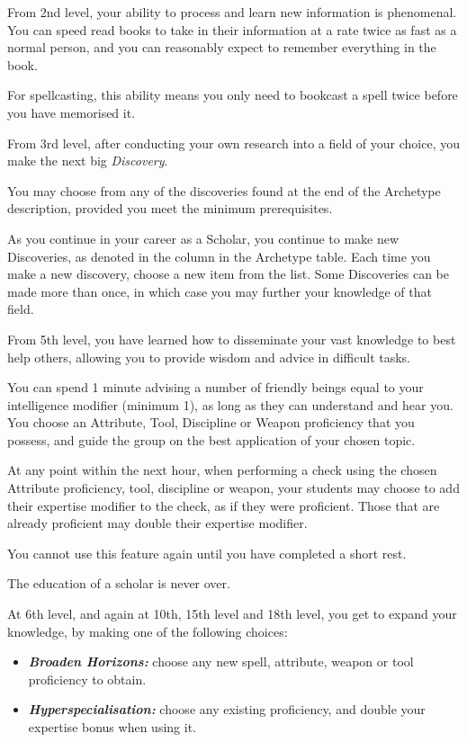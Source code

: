 {
From 2nd level, your ability to process and learn new information is phenomenal. You can speed read books to take in their information at a rate twice as fast as a normal person, and you can reasonably expect to remember everything in the book. 

For spellcasting, this ability means you only need to book\minus{}cast a spell twice before you have memorised it. 
}
{
From 3rd level, after conducting your own research into a field of your choice, you make the next big {\it Discovery}. 

You may choose from any of the discoveries found at the end of the Archetype description, provided you meet the minimum prerequisites. 

As you continue in your career as a Scholar, you continue to make new Discoveries, as denoted in the column in the Archetype table. Each time you make a new discovery, choose a new item from the list. Some Discoveries can be made more than once, in which case you may further your knowledge of that field. 
}
{
	From 5th level, you have learned how to disseminate your vast knowledge to best help others, allowing you to provide wisdom and advice in difficult tasks. 
	
	You can spend 1 minute advising a number of friendly beings equal to your intelligence modifier (minimum 1), as long as they can understand and hear you. You choose an Attribute, Tool, Discipline or Weapon proficiency that you possess, and guide the group on the best application of your chosen topic. 

	At any point within the next hour, when performing a check using the chosen Attribute proficiency, tool, discipline or weapon, your students may choose to add their expertise modifier to the check, as if they were proficient. Those that are already proficient may double their expertise modifier. 
	
	You cannot use this feature again until you have completed a short rest. 
	
}
{
	The education of a scholar is never over. 
	
	At 6th level, and again at 10th, 15th level and 18th level, you get to expand your knowledge, by making one of the following choices:
	
	\begin{itemize}
		\item \textbf{\textit{Broaden Horizons:}} choose any new spell, attribute, weapon or tool proficiency to obtain. 
			\item \textbf{\textit{Hyperspecialisation:}} choose any existing proficiency, and double your expertise bonus when using it. 
	\end{itemize}
}

